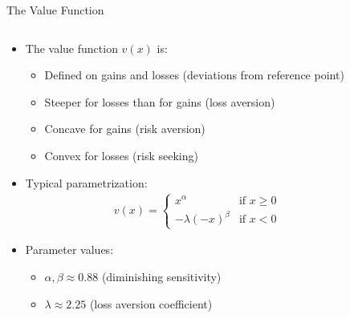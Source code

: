 \documentclass[10pt]{beamer}
\begin{document}
\begin{frame}{The Value Function}
  \begin{columns}
    \begin{column}{0.55\textwidth}
      \begin{itemize}[<+->]
        \item The value function $v(x)$ is:
          \begin{itemize}
            \item Defined on gains and losses (deviations from reference point)
            \item Steeper for losses than for gains (loss aversion)
            \item Concave for gains (risk aversion)
            \item Convex for losses (risk seeking)
          \end{itemize}
        \item Typical parametrization:
          \begin{align*}
            v(x) = 
            \begin{cases}
              x^{\alpha} & \text{if } x \geq 0 \\
              -\lambda(-x)^{\beta} & \text{if } x < 0
            \end{cases}
          \end{align*}
        \item Parameter values:
          \begin{itemize}
            \item $\alpha, \beta \approx 0.88$ (diminishing sensitivity)
            \item $\lambda \approx 2.25$ (loss aversion coefficient)
          \end{itemize}
      \end{itemize}
    \end{column}
    \begin{column}{0.45\textwidth}
      \onslide<+->
\end{column}
\end{columns}
\end{frame}
\end{document}
